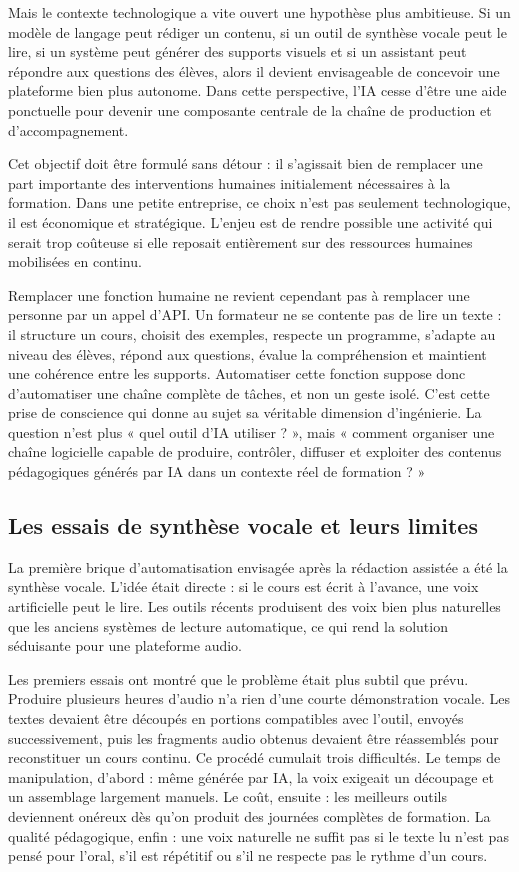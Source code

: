 Mais le contexte technologique a vite ouvert une hypothèse plus ambitieuse. Si un modèle
de langage peut rédiger un contenu, si un outil de synthèse vocale peut le lire, si un
système peut générer des supports visuels et si un assistant peut répondre aux questions
des élèves, alors il devient envisageable de concevoir une plateforme bien plus autonome.
Dans cette perspective, l'IA cesse d'être une aide ponctuelle pour devenir une composante
centrale de la chaîne de production et d'accompagnement.

Cet objectif doit être formulé sans détour : il s'agissait bien de remplacer une part
importante des interventions humaines initialement nécessaires à la formation. Dans une
petite entreprise, ce choix n'est pas seulement technologique, il est économique et
stratégique. L'enjeu est de rendre possible une activité qui serait trop coûteuse si elle
reposait entièrement sur des ressources humaines mobilisées en continu.

Remplacer une fonction humaine ne revient cependant pas à remplacer une personne par
un appel d'API. Un formateur ne se contente pas de lire un texte : il structure un cours,
choisit des exemples, respecte un programme, s'adapte au niveau des élèves, répond aux
questions, évalue la compréhension et maintient une cohérence entre les supports.
Automatiser cette fonction suppose donc d'automatiser une chaîne complète de tâches, et
non un geste isolé. C'est cette prise de conscience qui donne au sujet sa véritable
dimension d'ingénierie. La question n'est plus « quel outil d'IA utiliser ? », mais «
comment organiser une chaîne logicielle capable de produire, contrôler, diffuser et
exploiter des contenus pédagogiques générés par IA dans un contexte réel de formation ? »

\subsection{Les essais de synthèse vocale et leurs limites}

La première brique d'automatisation envisagée après la rédaction assistée a été la synthèse
vocale. L'idée était directe : si le cours est écrit à l'avance, une voix artificielle peut le
lire. Les outils récents produisent des voix bien plus naturelles que les anciens systèmes
de lecture automatique, ce qui rend la solution séduisante pour une plateforme audio.

Les premiers essais ont montré que le problème était plus subtil que prévu. Produire
plusieurs heures d'audio n'a rien d'une courte démonstration vocale. Les textes devaient
être découpés en portions compatibles avec l'outil, envoyés successivement, puis les
fragments audio obtenus devaient être réassemblés pour reconstituer un cours continu. Ce
procédé cumulait trois difficultés. Le temps de manipulation, d'abord : même générée par
IA, la voix exigeait un découpage et un assemblage largement manuels. Le coût, ensuite :
les meilleurs outils deviennent onéreux dès qu'on produit des journées complètes de
formation. La qualité pédagogique, enfin : une voix naturelle ne suffit pas si le texte lu
n'est pas pensé pour l'oral, s'il est répétitif ou s'il ne respecte pas le rythme d'un cours.

